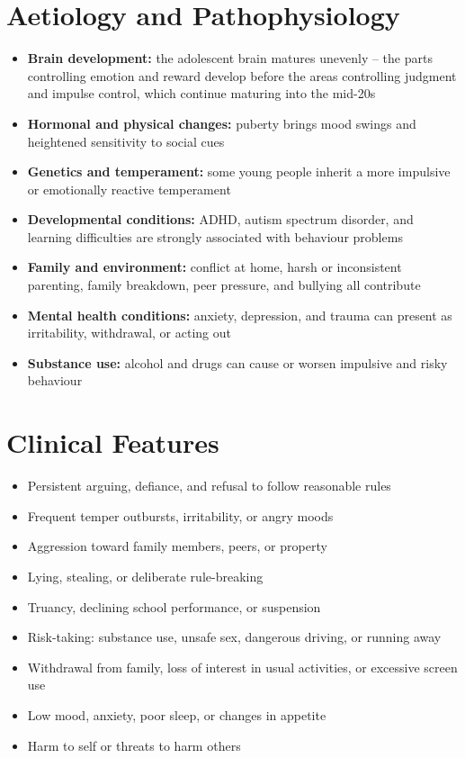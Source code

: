 \section*{Aetiology and Pathophysiology}
\begin{itemize}
    \item \textbf{Brain development:} the adolescent brain matures unevenly -- the parts controlling emotion and reward develop before the areas controlling judgment and impulse control, which continue maturing into the mid-20s
    \item \textbf{Hormonal and physical changes:} puberty brings mood swings and heightened sensitivity to social cues
    \item \textbf{Genetics and temperament:} some young people inherit a more impulsive or emotionally reactive temperament
    \item \textbf{Developmental conditions:} ADHD, autism spectrum disorder, and learning difficulties are strongly associated with behaviour problems
    \item \textbf{Family and environment:} conflict at home, harsh or inconsistent parenting, family breakdown, peer pressure, and bullying all contribute
    \item \textbf{Mental health conditions:} anxiety, depression, and trauma can present as irritability, withdrawal, or acting out
    \item \textbf{Substance use:} alcohol and drugs can cause or worsen impulsive and risky behaviour
\end{itemize}

\section*{Clinical Features}
\begin{itemize}
    \item Persistent arguing, defiance, and refusal to follow reasonable rules
    \item Frequent temper outbursts, irritability, or angry moods
    \item Aggression toward family members, peers, or property
    \item Lying, stealing, or deliberate rule-breaking
    \item Truancy, declining school performance, or suspension
    \item Risk-taking: substance use, unsafe sex, dangerous driving, or running away
    \item Withdrawal from family, loss of interest in usual activities, or excessive screen use
    \item Low mood, anxiety, poor sleep, or changes in appetite
    \item Harm to self or threats to harm others
\end{itemize}


